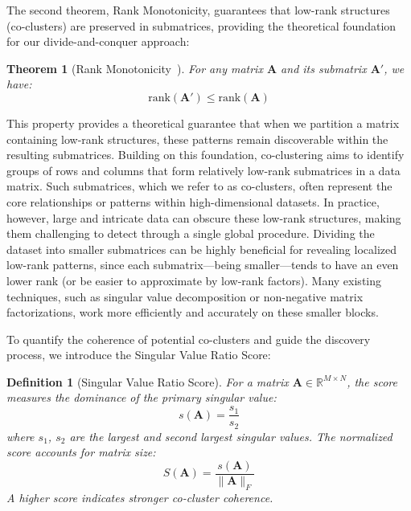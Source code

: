 \documentclass[journal]{IEEEtran}
\newtheorem{theorem}{Theorem}
\newtheorem{definition}{Definition}
\renewcommand{\cite}[1]{~\autocite{#1}}
\begin{document}
The second theorem, Rank Monotonicity, guarantees that low-rank structures (co-clusters) are preserved in submatrices, providing the theoretical foundation for our divide-and-conquer approach:

\begin{theorem}[Rank Monotonicity\cite{horn1985MatrixAnalysis}] \label{thm:rank_monotonicity}
    For any matrix $\mathbf{A}$ and its submatrix $\mathbf{A}'$, we have:
    \begin{equation}
        \text{rank}(\mathbf{A}') \leq \text{rank}(\mathbf{A})
    \end{equation}
\end{theorem}

This property provides a theoretical guarantee that when we partition a matrix containing low-rank structures, these patterns remain discoverable within the resulting submatrices. Building on this foundation, co-clustering aims to identify groups of rows and columns that form relatively low-rank submatrices in a data matrix. Such submatrices, which we refer to as co-clusters, often represent the core relationships or patterns within high-dimensional datasets. In practice, however, large and intricate data can obscure these low-rank structures, making them challenging to detect through a single global procedure. Dividing the dataset into smaller submatrices can be highly beneficial for revealing localized low-rank patterns, since each submatrix—being smaller—tends to have an even lower rank (or be easier to approximate by low-rank factors). Many existing techniques, such as singular value decomposition or non-negative matrix factorizations, work more efficiently and accurately on these smaller blocks.

To quantify the coherence of potential co-clusters and guide the discovery process, we introduce the Singular Value Ratio Score:

\begin{definition}[Singular Value Ratio Score]
    For a matrix $\mathbf{A} \in \mathbb{R}^{M \times N}$, the score measures the dominance of the primary singular value:
    \begin{equation}
        s(\mathbf{A}) = \frac{s_1}{s_2}
    \end{equation}
    where $s_1$, $s_2$ are the largest and second largest singular values. The normalized score accounts for matrix size:
    \begin{equation}
        S(\mathbf{A}) = \frac{s(\mathbf{A})}{\|\mathbf{A}\|_F}
    \end{equation}
    A higher score indicates stronger co-cluster coherence.
\end{definition}
\end{document}

